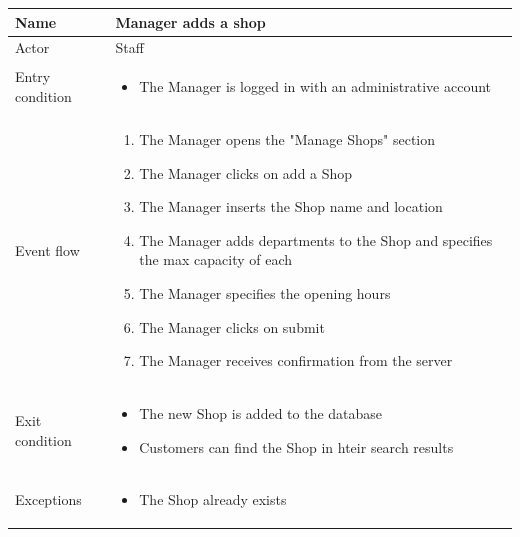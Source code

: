 \begin{table}[H]
    \begin{tabu} to \textwidth {|X|X[4]|}
        \hline
        Name            & Manager adds a shop        \\ \hline
        Actor           & Staff                      \\ \hline
        Entry condition & \begin{itemize}
            \item The Manager is logged in with an administrative account
        \end{itemize} \\ \hline
        Event flow      & \begin{enumerate}
            \item The Manager opens the "Manage Shops" section
            \item The Manager clicks on add a Shop
            \item The Manager inserts the Shop name and location
            \item The Manager adds departments to the Shop and specifies the max capacity of each
            \item The Manager specifies the opening hours
            \item The Manager clicks on submit
            \item The Manager receives confirmation from the server
        \end{enumerate} \\ \hline
        Exit condition  & \begin{itemize}
            \item The new Shop is added to the database
            \item Customers can find the Shop in hteir search results
        \end{itemize} \\ \hline
        Exceptions      & \begin{itemize}
            \item The Shop already exists
        \end{itemize} \\ \hline
    \end{tabu}
\end{table}

